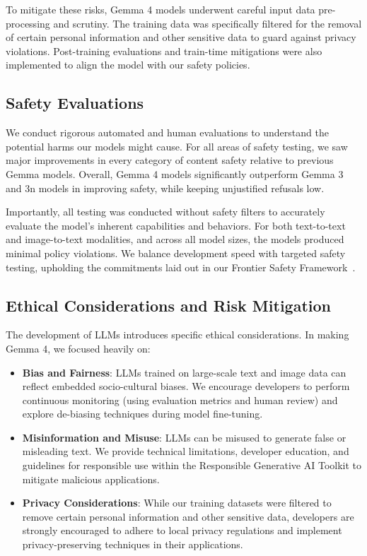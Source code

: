 \documentclass[11pt, a4paper, logo, twocolumn, copyright]{googledeepmind}
\begin{document}
To mitigate these risks, Gemma 4 models underwent careful input data pre-processing and scrutiny. The training data was specifically filtered for the removal of certain personal information and other sensitive data to guard against privacy violations. Post-training evaluations and train-time mitigations were also implemented to align the model with our safety policies.

\subsection{Safety Evaluations}

We conduct rigorous automated and human evaluations to understand the potential harms our models might cause. For all areas of safety testing, we saw major improvements in every category of content safety relative to previous Gemma models. Overall, Gemma 4 models significantly outperform Gemma 3 and 3n models in improving safety, while keeping unjustified refusals low. 

Importantly, all testing was conducted without safety filters to accurately evaluate the model's inherent capabilities and behaviors. For both text-to-text and image-to-text modalities, and across all model sizes, the models produced minimal policy violations. We balance development speed with targeted safety testing, upholding the commitments laid out in our Frontier Safety Framework~\citep{DeepMind_2025_strengthening_frontier_safety_framework}.

\subsection{Ethical Considerations and Risk Mitigation}

The development of LLMs introduces specific ethical considerations. In making Gemma 4, we focused heavily on:
\begin{itemize}[itemsep=8pt,leftmargin=10pt]
    \item \textbf{Bias and Fairness}: LLMs trained on large-scale text and image data can reflect embedded socio-cultural biases. We encourage developers to perform continuous monitoring (using evaluation metrics and human review) and explore de-biasing techniques during model fine-tuning.
    \item \textbf{Misinformation and Misuse}: LLMs can be misused to generate false or misleading text. We provide technical limitations, developer education, and guidelines for responsible use within the Responsible Generative AI Toolkit to mitigate malicious applications.
    \item \textbf{Privacy Considerations}: While our training datasets were filtered to remove certain personal information and other sensitive data, developers are strongly encouraged to adhere to local privacy regulations and implement privacy-preserving techniques in their applications.
\end{itemize}
\end{document}
